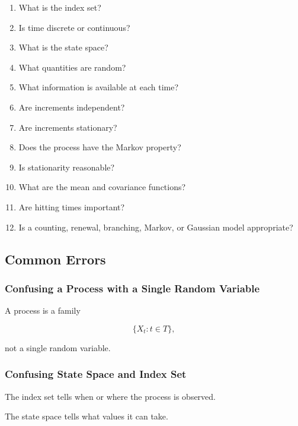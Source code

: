 \begin{enumerate}
    \item What is the index set?
    \item Is time discrete or continuous?
    \item What is the state space?
    \item What quantities are random?
    \item What information is available at each time?
    \item Are increments independent?
    \item Are increments stationary?
    \item Does the process have the Markov property?
    \item Is stationarity reasonable?
    \item What are the mean and covariance functions?
    \item Are hitting times important?
    \item Is a counting, renewal, branching, Markov, or Gaussian model
          appropriate?
\end{enumerate}

\subsection{Common Errors}
\label{subsec:stochastic-process-common-errors}

\subsubsection{Confusing a Process with a Single Random Variable}

A process is a family

\[
\{X_t:t\in T\},
\]

not a single random variable.

\subsubsection{Confusing State Space and Index Set}

The index set tells when or where the process is observed.

The state space tells what values it can take.

